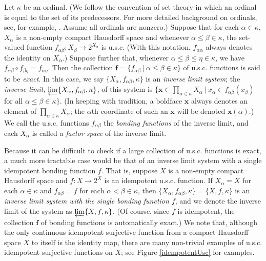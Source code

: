 \documentclass{amsart}
\theoremstyle{definition}
\newcommand{\<}{\langle}
\renewcommand{\>}{\rangle}
\begin{document}
Let $\kappa$ be an ordinal. (We follow the convention of set theory in which an ordinal is equal to the set of its predecessors. For more detailed background on ordinals, see, for example, \cite{Kunen}. Assume all ordinals are nonzero.) Suppose that for each $\alpha \in \kappa$, $X_{\alpha}$ is a non-empty compact Hausdorff space and whenever $\alpha \le \beta \in \kappa$, the set-valued function $f_{\alpha \beta} : X_{\beta} \rightarrow 2^{X_{\alpha}}$ is u.s.c. (With this notation, $f_{\alpha \alpha}$ always denotes the identity on $X_{\alpha}$.) Suppose further that, whenever $\alpha \le \beta \le \eta \in \kappa$, we have $f_{\alpha \beta} \circ f_{\beta \eta} = f_{\alpha \eta}$. Then the collection $\textbf{f} = \{ f_{\alpha \beta} \ | \ \alpha \le \beta \in \kappa\}$ of u.s.c. functions is said to be \emph{exact}. In this case, we say $\{X_{\alpha}, f_{\alpha \beta}, \kappa\}$ is an \emph{inverse limit system}; the \emph{inverse limit}, $\varprojlim \{X_{\alpha}, f_{\alpha \beta}, \kappa\}$, of this system is $\{ \textbf{x} \in \prod_{\alpha \in \kappa} X_{\alpha} \ | \ x_{\alpha} \in f_{\alpha \beta}(x_{\beta})$ for all $\alpha \le \beta \in \kappa\}$. (In keeping with tradition, a boldface $\textbf{x}$ always denotes an element of $\prod_{\alpha \in \kappa} X_{\alpha}$; the $\alpha$th coordinate of such an $\textbf{x}$ will be denoted $\textbf{x}(\alpha)$.)  We call the u.s.c. functions $f_{\alpha \beta}$ the \emph{bonding functions} of the inverse limit, and each $X_{\alpha}$ is called a \emph{factor space} of the inverse limit.

Because it can be difficult to check if a large collection of u.s.c. functions is exact, a much more tractable case would be that of an inverse limit system with a single idempotent bonding function $f$. That is, suppose $X$ is a non-empty compact Hausdorff space and $f: X \rightarrow 2^{X}$ is an idempotent u.s.c. function. If $X_{\alpha} = X$ for each $\alpha \in \kappa$ and $f_{\alpha \beta} = f$ for each $\alpha < \beta \in \kappa$, then $\{X_{\alpha}, f_{\alpha \beta}, \kappa\} = \{X, f, \kappa\}$ is an \emph{inverse limit system with the single bonding function $f$}, and we denote the inverse limit of the system as $\varprojlim \{X, f, \kappa\}$. (Of course, since $f$ is idempotent, the collection $\textbf{f}$ of bonding functions is automatically exact.) We note that, although the only continuous idempotent surjective function from a compact Hausdorff space $X$ to itself is the identity map, there are many non-trivial examples of u.s.c. idempotent surjective functions on $X$; see Figure \ref{idempotentUsc} for examples.
\end{document}
